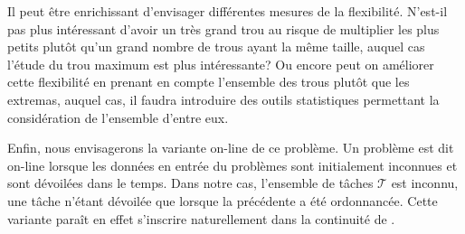 \documentclass[a4paper,11pt]{report}
\begin{document}
Il peut être enrichissant d'envisager différentes mesures de la flexibilité.
N'est-il pas plus intéressant d'avoir un très grand trou au risque de multiplier les plus petits
plutôt qu'un grand nombre de trous ayant la même taille, auquel cas l'étude du trou maximum est plus
intéressante? Ou encore peut on améliorer cette flexibilité en prenant en compte l'ensemble des
trous plutôt que les extremas, auquel cas, il faudra introduire des outils statistiques permettant
la considération de l'ensemble d'entre eux.

Enfin, nous envisagerons la variante on-line de ce problème. Un problème est dit on-line lorsque
les données en entrée du problèmes sont initialement inconnues et sont dévoilées dans le temps. Dans
notre cas, l'ensemble de tâches $\mathcal{T}$ est inconnu, une tâche n'étant dévoilée que lorsque la
précédente a été ordonnancée. Cette variante paraît en effet s'inscrire naturellement dans la
continuité de \fisched{}.

\newpage
\appendix


\end{document}
